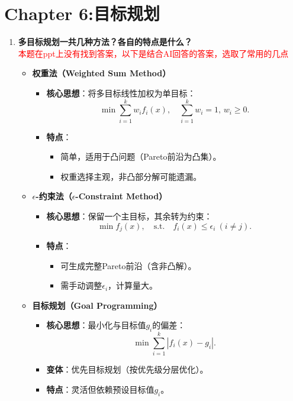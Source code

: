 	\section{Chapter 6:目标规划}
	\begin{enumerate}
		\item \textbf{多目标规划一共几种方法？各自的特点是什么？}\\
		\textcolor{red}{本题在ppt上没有找到答案，以下是结合AI回答的答案，选取了常用的几点}
		\begin{itemize}
			    \item \textbf{权重法（Weighted Sum Method）}
			\begin{itemize}
				\item \textbf{核心思想}：将多目标线性加权为单目标：
				$$ \min \sum_{i=1}^k w_i f_i(x), \quad \sum_{i=1}^k w_i = 1, \, w_i \geq 0. $$
				\item \textbf{特点}：
				\begin{itemize}
					\item 简单，适用于凸问题（Pareto前沿为凸集）。
					\item 权重选择主观，非凸部分解可能遗漏。
				\end{itemize}
			\end{itemize}

			\item \textbf{$\epsilon$-约束法（$\epsilon$-Constraint Method）}
			\begin{itemize}
				\item \textbf{核心思想}：保留一个主目标，其余转为约束：
				$$ \min f_j(x), \quad \text{s.t.} \quad f_i(x) \leq \epsilon_i \ (i \neq j). $$
				\item \textbf{特点}：
				\begin{itemize}
					\item 可生成完整Pareto前沿（含非凸解）。
					\item 需手动调整$\epsilon_i$，计算量大。
				\end{itemize}
			\end{itemize}

			\item \textbf{目标规划（Goal Programming）}
			\begin{itemize}
				\item \textbf{核心思想}：最小化与目标值$g_i$的偏差：
				$$ \min \sum_{i=1}^k |f_i(x) - g_i|. $$
				\item \textbf{变体}：优先目标规划（按优先级分层优化）。
				\item \textbf{特点}：灵活但依赖预设目标值$g_i$。
			\end{itemize}


\end{itemize}
\end{enumerate}
